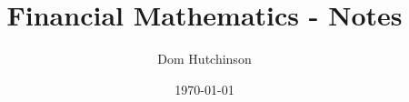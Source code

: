 \documentclass[11pt,a4paper]{article}
\begin{document}
\title{Financial Mathematics - Notes}
\author{Dom Hutchinson}
\date{\today}
\maketitle

\tableofcontents\newpage
\end{document}
